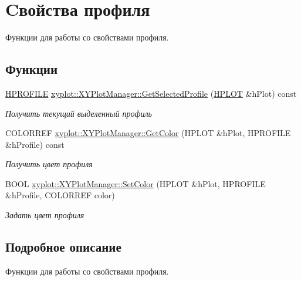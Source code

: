 \hypertarget{group__gr_prof_ex}{\section{Cвойства профиля}
\label{group__gr_prof_ex}
}


Функции для работы со свойствами профиля.  


\subsection*{Функции}
\begin{DoxyCompactItemize}
\item 
\hyperlink{classxyplot_1_1_h_p_r_o_f_i_l_e}{H\-P\-R\-O\-F\-I\-L\-E} \hyperlink{group__gr_prof_ex_ga3030074790ed5ddf22f2776226bd5442}{xyplot\-::\-X\-Y\-Plot\-Manager\-::\-Get\-Selected\-Profile} (\hyperlink{classxyplot_1_1_h_p_l_o_t}{H\-P\-L\-O\-T} \&h\-Plot) const 
\begin{DoxyCompactList}\small\item\em Получить текущий выделенный профиль \end{DoxyCompactList}\item 
C\-O\-L\-O\-R\-R\-E\-F \hyperlink{group__gr_prof_ex_gaafda2be977c03f1a2a5e2a35d4117feb}{xyplot\-::\-X\-Y\-Plot\-Manager\-::\-Get\-Color} (H\-P\-L\-O\-T \&h\-Plot, H\-P\-R\-O\-F\-I\-L\-E \&h\-Profile) const 
\begin{DoxyCompactList}\small\item\em Получить цвет профиля \end{DoxyCompactList}\item 
B\-O\-O\-L \hyperlink{group__gr_prof_ex_gadd75f7d7f166418aac31753a4a1bc59c}{xyplot\-::\-X\-Y\-Plot\-Manager\-::\-Set\-Color} (H\-P\-L\-O\-T \&h\-Plot, H\-P\-R\-O\-F\-I\-L\-E \&h\-Profile, C\-O\-L\-O\-R\-R\-E\-F color)
\begin{DoxyCompactList}\small\item\em Задать цвет профиля \end{DoxyCompactList}\end{DoxyCompactItemize}


\subsection{Подробное описание}
Функции для работы со свойствами профиля. 

